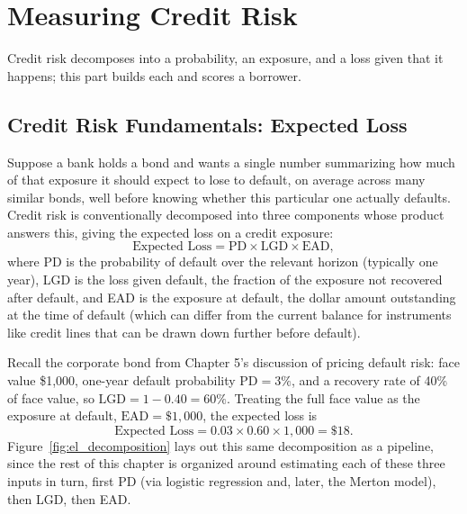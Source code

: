 \documentclass[../ai_in_finance]{subfiles}
\begin{document}
\section{Measuring Credit Risk}

Credit risk decomposes into a probability, an exposure, and a loss given that it happens; this part builds each and scores a borrower.

\subsection{Credit Risk Fundamentals: Expected Loss}
\label{sec:credit-risk-fundamentals}

Suppose a bank holds a bond and wants a single number summarizing how much of that exposure it should expect to lose to default, on average across many similar bonds, well before knowing whether this particular one actually defaults. Credit risk is conventionally decomposed into three components whose product answers this, giving the expected loss on a credit exposure:
\begin{equation*}
\text{Expected Loss} = \text{PD} \times \text{LGD} \times \text{EAD},
\end{equation*}
where PD is the probability of default over the relevant horizon (typically one year), LGD is the loss given default, the fraction of the exposure not recovered after default, and EAD is the exposure at default, the dollar amount outstanding at the time of default (which can differ from the current balance for instruments like credit lines that can be drawn down further before default).

Recall the corporate bond from Chapter 5's discussion of pricing default risk: face value \$1,000, one-year default probability $\text{PD}=3\%$, and a recovery rate of 40\% of face value, so $\text{LGD} = 1 - 0.40 = 60\%$. Treating the full face value as the exposure at default, $\text{EAD}=\$1{,}000$, the expected loss is
\begin{equation*}
\text{Expected Loss} = 0.03 \times 0.60 \times 1{,}000 = \$18.
\end{equation*}
Figure~\ref{fig:el_decomposition} lays out this same decomposition as a pipeline, since the rest of this chapter is organized around estimating each of these three inputs in turn, first PD (via logistic regression and, later, the Merton model), then LGD, then EAD.
\end{document}
